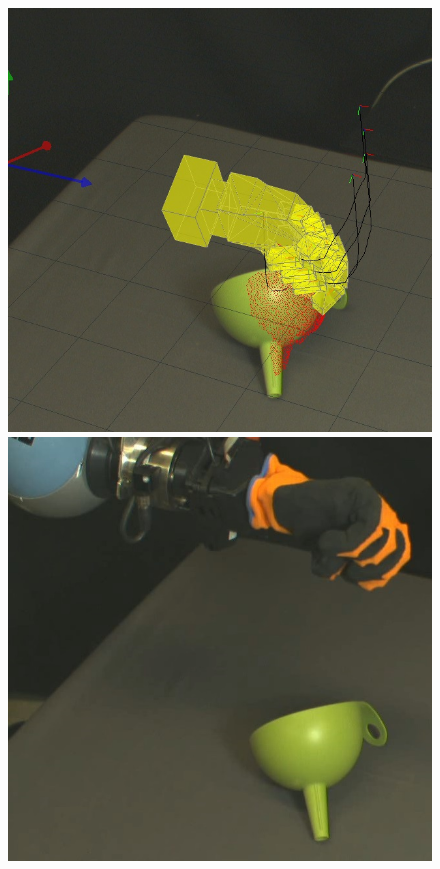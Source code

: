 \begin{figure}
\begin{center}
  \includegraphics[width=\tw]{images/experiments/query/funnellarge-1-s}
 \includegraphics[width=\tw]{images/experiments/exec/funnellarge-s}\\

\end{center}
\end{figure}
